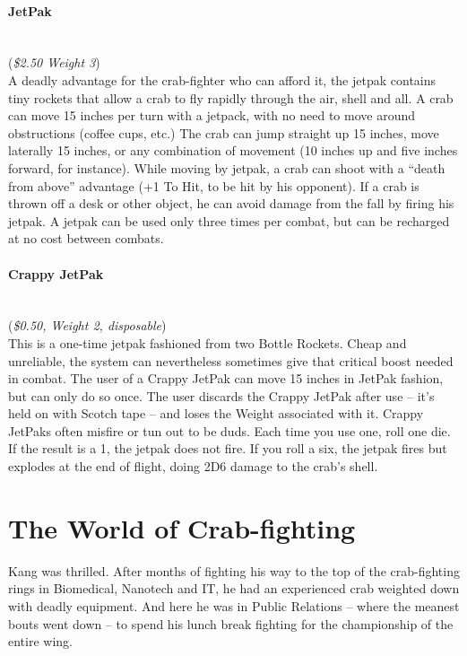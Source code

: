 \documentclass[a4paper,10pt]{article}
\begin{document}
\paragraph*{JetPak}
\label{sec:JetPak}
\hspace*{0px}\\(\textit{\$2.50 Weight 3})\\
A deadly advantage for the crab-fighter who can afford it, the jetpak contains tiny rockets that allow a crab to fly rapidly through the air, shell and all. A crab can move 15 inches per turn with a jetpack, with no need to move around obstructions (coffee cups, etc.) The crab can jump straight up 15 inches, move laterally 15 inches, or any combination of movement (10 inches up and five inches forward, for instance). While moving by jetpak, a crab can shoot with a ``death from above'' advantage (+1 To Hit,  to be hit by his opponent). If a crab is thrown off a desk or other object, he can avoid damage from the fall by firing his jetpak. A jetpak can be used only three times per combat, but can be recharged at no cost between combats.

\paragraph*{Crappy JetPak}
\label{sec:CrappyJetPak}
\hspace*{0px}\\(\textit{\$0.50, Weight 2, disposable})\\
This is a one-time jetpak fashioned from two Bottle Rockets. Cheap and unreliable, the system can nevertheless sometimes give that critical boost needed in combat. The user of a Crappy JetPak can move 15 inches in JetPak fashion, but can only do so once. The user discards the Crappy JetPak after use -- it's held on with Scotch\textsuperscript{\textregistered} tape -- and loses the Weight associated with it. Crappy JetPaks often misfire or tun out to be duds. Each time you use one, roll one die. If the result is a 1, the jetpak does not fire. If you roll a six, the jetpak fires but explodes at the end of flight, doing 2D6 damage to the crab's shell.

\section*{The World of Crab-fighting}
\label{sec:TheWorldofCrabfighting}

Kang was thrilled. After months of fighting his way to the top of the crab-fighting rings in Biomedical, Nanotech and IT, he had an experienced crab weighted down with deadly equipment. And here he was in Public Relations -- where the meanest bouts went down -- to spend his lunch break fighting for the championship of the entire wing.
\end{document}
